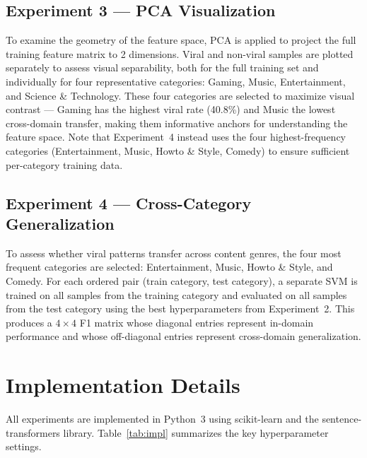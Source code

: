 \documentclass[12pt,a4paper]{article}
\begin{document}
\subsection{Experiment 3 --- PCA Visualization}

To examine the geometry of the feature space, PCA is applied to project the
full training feature matrix to 2 dimensions.  Viral and non-viral samples are
plotted separately to assess visual separability, both for the full training
set and individually for four representative categories: Gaming, Music,
Entertainment, and Science \& Technology.  These four categories are selected
to maximize visual contrast --- Gaming has the highest viral rate (40.8\%) and
Music the lowest cross-domain transfer, making them informative anchors for
understanding the feature space.  Note that Experiment~4 instead uses the four
highest-frequency categories (Entertainment, Music, Howto \& Style, Comedy) to
ensure sufficient per-category training data.

\subsection{Experiment 4 --- Cross-Category Generalization}

To assess whether viral patterns transfer across content genres, the four most
frequent categories are selected: Entertainment, Music, Howto \& Style, and
Comedy.  For each ordered pair (train category, test category), a separate SVM
is trained on all samples from the training category and evaluated on all
samples from the test category using the best hyperparameters from
Experiment~2.  This produces a $4\times4$ F1 matrix whose diagonal entries
represent in-domain performance and whose off-diagonal entries represent
cross-domain generalization.

\section{Implementation Details}

All experiments are implemented in Python~3 using scikit-learn and the
sentence-transformers library.  Table~\ref{tab:impl} summarizes the key
hyperparameter settings.
\end{document}
